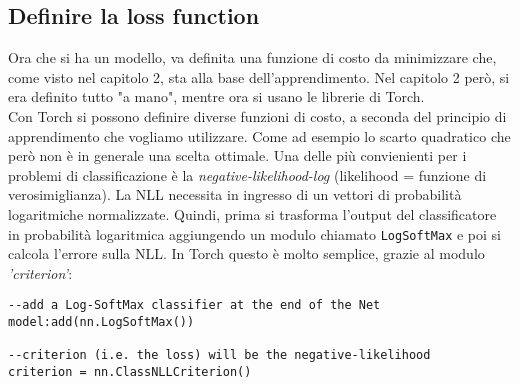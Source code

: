 \subsection{Definire la loss function}
Ora che si ha un modello, va definita una funzione di costo da minimizzare che, come visto nel capitolo 2, sta alla base dell’apprendimento. Nel capitolo 2 però, si era definito tutto "a mano", mentre ora si usano le librerie di Torch. \\Con Torch si possono definire diverse funzioni di costo, a seconda del principio di apprendimento che vogliamo utilizzare. Come ad esempio lo scarto quadratico che però non è in generale una scelta ottimale. Una delle più convienienti per i problemi di classificazione è la \emph{negative-likelihood-log} (likelihood = funzione di verosimiglianza). La NLL necessita in ingresso di un vettori di probabilità logaritmiche normalizzate. Quindi, prima si trasforma l’output del classificatore in probabilità logaritmica aggiungendo un modulo chiamato \texttt{LogSoftMax} e poi si calcola l'errore sulla NLL. In Torch questo è molto semplice, grazie al modulo \textit{'criterion'}: 

\begin{lstlisting}[language={[5.2]Lua}]
--add a Log-SoftMax classifier at the end of the Net
model:add(nn.LogSoftMax())

--criterion (i.e. the loss) will be the negative-likelihood
criterion = nn.ClassNLLCriterion()
\end{lstlisting}


